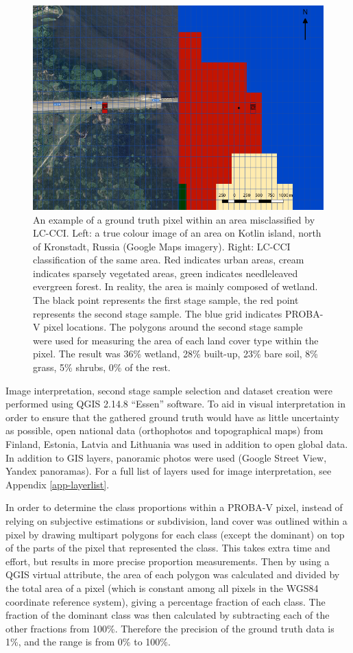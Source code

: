 \documentclass[a4paper,10pt]{book}
\begin{document}
\begin{figure}
 \includegraphics[width=\textwidth]{./thesis-figures/classification-example.png}
 \caption{An example of a ground truth pixel within an area misclassified by LC-CCI. Left: a true colour image of an area on Kotlin island, north of Kronstadt, Russia (Google Maps imagery). Right: LC-CCI classification of the same area. Red indicates urban areas, cream indicates sparsely vegetated areas, green indicates needleleaved evergreen forest. In reality, the area is mainly composed of wetland. The black point represents the first stage sample, the red point represents the second stage sample. The blue grid indicates PROBA-V pixel locations. The polygons around the second stage sample were used for measuring the area of each land cover type within the pixel. The result was 36\% wetland, 28\% built-up, 23\% bare soil, 8\% grass, 5\% shrubs, 0\% of the rest.}
 \label{fig-sampling}
\end{figure}

Image interpretation, second stage sample selection and dataset creation were performed using QGIS 2.14.8 ``Essen'' software. To aid in visual interpretation in order to ensure that the gathered ground truth would have as little uncertainty as possible, open national data (orthophotos and topographical maps) from Finland, Estonia, Latvia and Lithuania was used in addition to open global data. In addition to GIS layers, panoramic photos were used (Google Street View, Yandex panoramas). For a full list of layers used for image interpretation, see Appendix \ref{app-layerlist}.

In order to determine the class proportions within a PROBA-V pixel, instead of relying on subjective estimations or subdivision, land cover was outlined within a pixel by drawing multipart polygons for each class (except the dominant) on top of the parts of the pixel that represented the class. This takes extra time and effort, but results in more precise proportion measurements. Then by using a QGIS virtual attribute, the area of each polygon was calculated and divided by the total area of a pixel (which is constant among all pixels in the WGS84 coordinate reference system), giving a percentage fraction of each class. The fraction of the dominant class was then calculated by subtracting each of the other fractions from 100\%. Therefore the precision of the ground truth data is 1\%, and the range is from 0\% to 100\%.
\end{document}
